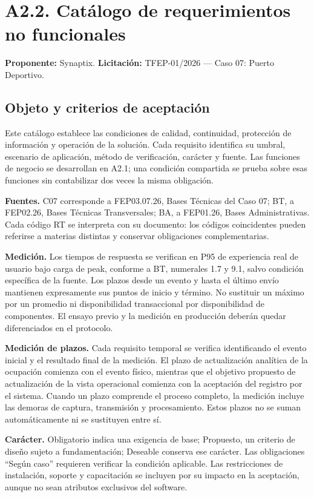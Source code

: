 \newpage
\section*{A2.2. Catálogo de requerimientos no funcionales}
\textbf{Proponente:} Synaptix. \quad \textbf{Licitación:} TFEP-01/2026 — Caso 07: Puerto Deportivo.

\subsection*{Objeto y criterios de aceptación}
Este catálogo establece las condiciones de calidad, continuidad, protección de
información y operación de la solución. Cada requisito identifica su umbral,
escenario de aplicación, método de verificación, carácter y fuente.
Las funciones de negocio se desarrollan en A2.1; una condición compartida se
prueba sobre esas funciones sin contabilizar dos veces la misma obligación.

\textbf{Fuentes.} C07 corresponde a FEP03.07.26, Bases Técnicas del Caso 07;
BT, a FEP02.26, Bases Técnicas Transversales; BA, a FEP01.26, Bases Administrativas.
Cada código RT se interpreta con su documento: los códigos coincidentes pueden
referirse a materias distintas y conservar obligaciones complementarias.

\textbf{Medición.} Los tiempos de respuesta se verifican en P95 de experiencia
real de usuario bajo carga de peak, conforme a BT, numerales 1.7 y 9.1,
salvo condición específica de la fuente. Los plazos desde un evento y hasta
el último envío mantienen expresamente sus puntos de inicio y término.
No sustituir un máximo por un promedio ni disponibilidad transaccional por
disponibilidad de componentes. El ensayo previo y la medición en producción
deberán quedar diferenciados en el protocolo.

\textbf{Medición de plazos.} Cada requisito temporal se verifica identificando el evento inicial y el resultado final de la medición. El plazo de actualización analítica de la ocupación comienza con el evento físico, mientras que el objetivo propuesto de actualización de la vista operacional comienza con la aceptación del registro por el sistema. Cuando un plazo comprende el proceso completo, la medición incluye las demoras de captura, transmisión
y procesamiento. Estos plazos no se suman automáticamente ni se sustituyen entre sí.

\textbf{Carácter.} Obligatorio indica una exigencia de base; Propuesto,
un criterio de diseño sujeto a fundamentación; Deseable conserva ese carácter.
Las obligaciones ``Según caso'' requieren verificar la condición aplicable.
Las restricciones de instalación, soporte y capacitación se incluyen por su
impacto en la aceptación, aunque no sean atributos exclusivos del software.

